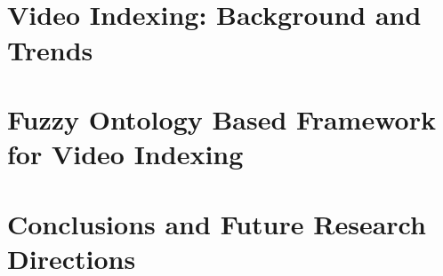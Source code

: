 \documentclass[a4paper,11pt,onecolumn,oneside]{regimthese}
\begin{document}
	\dominitoc
	\PagesCouverture
	\newpage \pagestyle{empty} ~
	\frontmatter{}
	
	\tablefancy
	
	
	
	

	\newpage ~

	\lestables		%
	

	\mainmatter{}	%
	\regimfancy
			
	\regimfancy
	\part{Video Indexing: Background and Trends}
			
			
	\part{Fuzzy Ontology Based Framework for Video Indexing}
			
			
			
			
	\part{Conclusions and Future Research Directions}
			
\appendix








\bibliographyfancy


\newpage \pagestyle{empty} ~

%

\newpage \pagestyle{empty} ~


%
\end{document}
